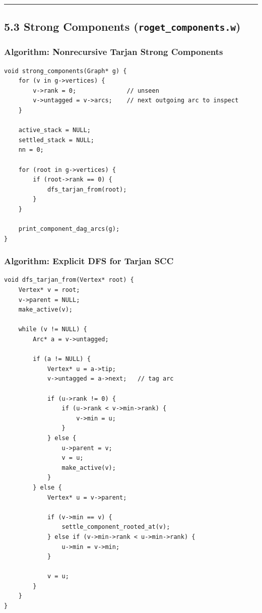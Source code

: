 \documentclass[11pt]{article}
\begin{document}
\begin{center}\rule{0.5\linewidth}{0.5pt}\end{center}

\subsection{\texorpdfstring{5.3 Strong Components (\texttt{roget\_components.w})}{5.3 Strong Components (roget\_components.w)}}\label{strong-components-roget_components.w}

\subsubsection{Algorithm: Nonrecursive Tarjan Strong Components}\label{algorithm-nonrecursive-tarjan-strong-components}

\begin{verbatim}
void strong_components(Graph* g) {
    for (v in g->vertices) {
        v->rank = 0;              // unseen
        v->untagged = v->arcs;    // next outgoing arc to inspect
    }

    active_stack = NULL;
    settled_stack = NULL;
    nn = 0;

    for (root in g->vertices) {
        if (root->rank == 0) {
            dfs_tarjan_from(root);
        }
    }

    print_component_dag_arcs(g);
}
\end{verbatim}

\subsubsection{Algorithm: Explicit DFS for Tarjan SCC}\label{algorithm-explicit-dfs-for-tarjan-scc}

\begin{verbatim}
void dfs_tarjan_from(Vertex* root) {
    Vertex* v = root;
    v->parent = NULL;
    make_active(v);

    while (v != NULL) {
        Arc* a = v->untagged;

        if (a != NULL) {
            Vertex* u = a->tip;
            v->untagged = a->next;   // tag arc

            if (u->rank != 0) {
                if (u->rank < v->min->rank) {
                    v->min = u;
                }
            } else {
                u->parent = v;
                v = u;
                make_active(v);
            }
        } else {
            Vertex* u = v->parent;

            if (v->min == v) {
                settle_component_rooted_at(v);
            } else if (v->min->rank < u->min->rank) {
                u->min = v->min;
            }

            v = u;
        }
    }
}
\end{verbatim}
\end{document}
